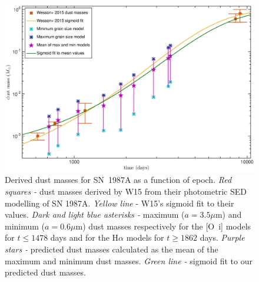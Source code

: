 \documentclass[useAMS,usenatbib,usegraphicx]{mnras}
\begin{document}

\begin{figure}
\begin{center}
\includegraphics[trim =70 30 85 15,clip=true,scale=0.58]{Mdust_evol5}
\caption{Derived dust masses for SN~1987A as a function of epoch. \textit{Red squares -} dust masses derived by W15 
from their photometric SED modelling of SN 1987A. \textit{Yellow line} - W15's sigmoid fit to 
their values. \textit{Dark and light blue asterisks -} maximum ($a=3.5\mu$m) and 
minimum ($a=0.6\mu$m) dust masses respectively for the [O~{\sc i}] models for $t \le 1478$ days and for the H$\alpha$ models for $t \ge 1862$ days. \textit{Purple 
stars -} predicted dust masses calculated as the mean of the maximum and minimum dust masses.
\textit{Green line -} sigmoid fit 
to our predicted dust masses.}
\label{Mdust}
\end{center}
\end{figure}
\end{document}
